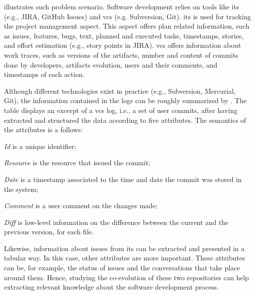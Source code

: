  illustrates such problem scenario. Software development relies on tools like \gls{its} (e.g., JIRA, GitHub Issues) and \gls{vcs} (e.g. Subversion, Git). \Gls{its} is used for tracking the project management aspect. This aspect offers plan related information, such as issues, features, bugs, text, planned and executed tasks, timestamps, stories, and effort estimation (e.g., story points in JIRA).
\Gls{vcs} offers information about work traces, such as versions of the artifacts, number and content of commits done by developers, artifacts evolution, users and their comments, and timestamps of each action. 


Although different technologies exist in practice (e.g., Subversion, Mercurial, Git), the information contained in the logs can be roughly summarized by .   The table displays an excerpt of a \gls{vcs} log, i.e., a set of user commits, after having extracted and structured the data according to five attributes. The semantics of the  attributes is a follows: 
\begin{inparaenum}[\itshape i)]
	\item \emph{Id} is a unique identifier;
	\item \emph{Resource} is the resource that issued the commit;
	\item \emph{Date} is a timestamp associated to the time and date the commit was stored in the system;
	\item \emph{Comment} is a user comment on the changes made;
	\item \emph{Diff} is low-level information on the difference between the current and the previous version, for each file.
\end{inparaenum} 
Likewise, information about issues from \gls{its} can be extracted and presented in a tabular way. In this case, other attributes are more important. These attributes can be, for example, the status of issues and the conversations that take place around them. %
Hence, studying the co-evolution of these two repositories can help extracting relevant knowledge about the software development process. 

